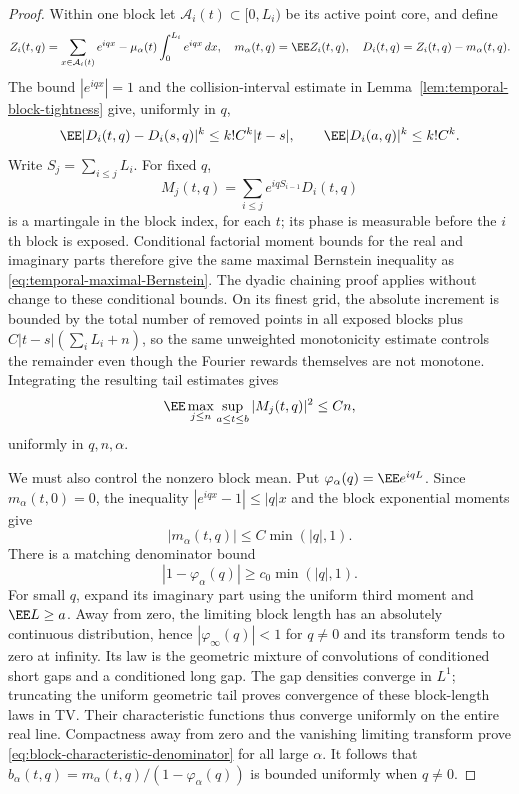 \documentclass[11pt,letterpaper]{article}
\begin{document}
\begin{proof}
Within one block let $\mathcal A_i(t)\subset[0,L_i)$ be its
active point core, and define
\[
 Z_i(t,q)=\sum_{x\in\mathcal A_i(t)}e^{iqx}
                -\mu_\alpha(t)\int_0^{L_i}e^{iqx}\,dx,
 \quad m_\alpha(t,q)=\EE Z_i(t,q),
 \quad D_i(t,q)=Z_i(t,q)-m_\alpha(t,q).
\]
The bound $|e^{iqx}|=1$ and the collision-interval estimate in
Lemma~\ref{lem:temporal-block-tightness} give, uniformly in $q$,
\[
 \EE|D_i(t,q)-D_i(s,q)|^k\le k!C^k|t-s|,
 \qquad \EE|D_i(a,q)|^k\le k!C^k.
\]
Write $S_j=\sum_{i\le j}L_i$. For fixed $q$,
\[
 M_j(t,q)=\sum_{i\le j}e^{iqS_{i-1}}D_i(t,q)
\]
is a martingale in the block index, for each $t$; its phase
is measurable before the $i$th block is exposed. Conditional
factorial moment bounds for the real and imaginary parts
therefore give the same maximal Bernstein inequality as
\eqref{eq:temporal-maximal-Bernstein}.
The dyadic chaining proof applies without change to these
conditional bounds. On its finest grid, the absolute increment
is bounded by the total number of removed points in all exposed
blocks plus $C|t-s|(\sum_iL_i+n)$, so the same unweighted
monotonicity estimate controls the remainder even though the
Fourier rewards themselves are not monotone. Integrating the
resulting tail estimates gives
\begin{equation}\label{eq:Fourier-block-martingale-max}
 \EE\max_{j\le n}\sup_{a\le t\le b}|M_j(t,q)|^2\le Cn,
\end{equation}
uniformly in $q,n,\alpha$.

We must also control the nonzero block mean. Put
$\varphi_\alpha(q)=\EE e^{iqL}$. Since
$m_\alpha(t,0)=0$, the inequality $|e^{iqx}-1|\le|q|x$
and the block exponential moments give
\[
 |m_\alpha(t,q)|\le C\min(|q|,1).
\]
There is a matching denominator bound
\begin{equation}\label{eq:block-characteristic-denominator}
 |1-\varphi_\alpha(q)|\ge c_0\min(|q|,1).
\end{equation}
For small $q$, expand its imaginary part using the uniform
third moment and $\EE L\ge a$. Away from zero, the limiting
block length has an absolutely continuous distribution, hence
$|\varphi_\infty(q)|<1$ for $q\ne0$ and its transform tends
to zero at infinity. Its law is the geometric mixture of
convolutions of conditioned short gaps and a conditioned long
gap. The gap densities converge in $L^1$; truncating the
uniform geometric tail proves convergence of these block-length
laws in TV. Their characteristic functions thus converge
uniformly on the entire real line. Compactness away from zero
and the vanishing limiting transform prove
\eqref{eq:block-characteristic-denominator} for all large
$\alpha$.
It follows that
$b_\alpha(t,q)=m_\alpha(t,q)/(1-\varphi_\alpha(q))$ is bounded
uniformly when $q\ne0$.


\end{proof}
\end{document}
